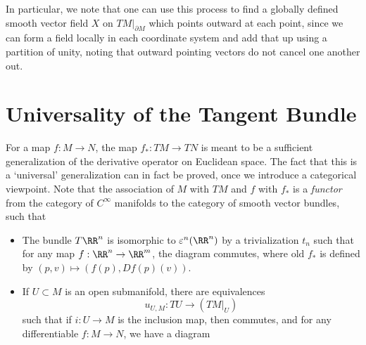\begin{remark}
    In particular, we note that one can use this process to find a globally defined smooth vector field $X$ on $TM|_{\partial M}$ which points outward at each point, since we can form a field locally in each coordinate system and add that up using a partition of unity, noting that outward pointing vectors do not cancel one another out.
\end{remark}

\section{Universality of the Tangent Bundle}

For a map $f:M \to N$, the map $f_*: TM \to TN$ is meant to be a sufficient generalization of the derivative operator on Euclidean space. The fact that this is a `universal' generalization can in fact be proved, once we introduce a categorical viewpoint. Note that the association of $M$ with $TM$ and $f$ with $f_*$ is a {\it functor} from the category of $C^\infty$ manifolds to the category of smooth vector bundles, such that
%
\begin{itemize}
    \item The bundle $T\RR^n$ is isomorphic to $\varepsilon^n(\RR^n)$ by a trivialization $t_n$ such that for any map $f: \RR^n \to \RR^m$, the diagram
    commutes, where $\text{old $f_*$}$ is defined by $(p,v) \mapsto (f(p), Df(p)(v))$.
    \item If $U \subset M$ is an open submanifold, there are equivalences
    \[ u_{U,M}: TU \to (TM|_U) \]
    such that if $i: U \to M$ is the inclusion map, then
    commutes, and for any differentiable $f:M \to N$, we have a diagram
\end{itemize}
